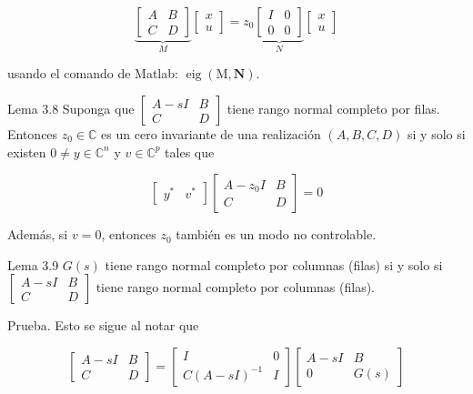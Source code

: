 $$
\underbrace{\left[\begin{array}{ll}
A & B \\
C & D
\end{array}\right]}_{M}\left[\begin{array}{l}
x \\
u
\end{array}\right]=z_{0} \underbrace{\left[\begin{array}{ll}
I & 0 \\
0 & 0
\end{array}\right]}_{N}\left[\begin{array}{l}
x \\
u
\end{array}\right]
$$

usando el comando de Matlab: $\operatorname{eig}(\mathrm{M}, \mathbf{N})$.

Lema 3.8 Suponga que $\left[\begin{array}{cc}A-s I & B \\ C & D\end{array}\right]$ tiene rango normal completo por filas. Entonces $z_{0} \in \mathbb{C}$ es un cero invariante de una realización $(A, B, C, D)$ si y solo si existen $0 \neq y \in \mathbb{C}^{n}$ y $v \in \mathbb{C}^{p}$ tales que

$$
\left[\begin{array}{ll}
y^{*} & v^{*}
\end{array}\right]\left[\begin{array}{cc}
A-z_{0} I & B \\
C & D
\end{array}\right]=0
$$

Además, si $v=0$, entonces $z_{0}$ también es un modo no controlable.

Lema 3.9 $G(s)$ tiene rango normal completo por columnas (filas) si y solo si $\left[\begin{array}{cc}A-s I & B \\ C & D\end{array}\right]$ tiene rango normal completo por columnas (filas).

Prueba. Esto se sigue al notar que

$$
\left[\begin{array}{cc}
A-s I & B \\
C & D
\end{array}\right]=\left[\begin{array}{cc}
I & 0 \\
C(A-s I)^{-1} & I
\end{array}\right]\left[\begin{array}{cc}
A-s I & B \\
0 & G(s)
\end{array}\right]
$$

